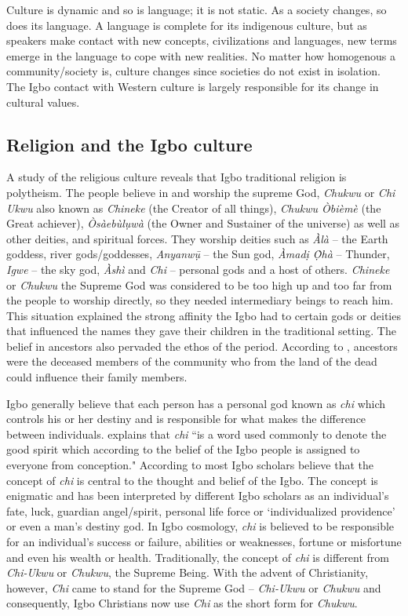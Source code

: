 \documentclass[output=paper]{langscibook}
\begin{document}
Culture is dynamic and so is language; it is not static. As a society changes, so does its language. A language is complete for its indigenous culture, but as speakers make contact with new concepts, civilizations and languages, new terms emerge in the language to cope with new realities. No matter how homogenous a community/society is, culture changes since societies do not exist in isolation. The Igbo contact with Western culture is largely responsible for its change in cultural values.

\subsection{Religion and the Igbo culture}
A study of the religious culture reveals that Igbo traditional religion is polytheism. The people believe in and worship the supreme God, \textit{Chukwu }or \textit{Chi Ukwu} also known as \textit{Chineke} (the Creator of all things), \textit{Chukwu Òbièmè} (the Great achiever), \textit{Òsàebùlụwà} (the Owner and Sustainer of the universe) as well as other deities, and spiritual forces. They worship deities such as \textit{Àlà} -- the Earth goddess, river gods/goddesses, \textit{Anyanwụ̄} -- the Sun god, \textit{Àmadị Ọ̀hà} -- Thunder,  \textit{Igwe} -- the sky god, \textit{Àshì} and \textit{Chi} -- personal gods and a host of others. \textit{Chineke} or \textit{Chukwu} the Supreme God was considered to be too high up and too far from the people to worship directly, so they needed intermediary beings to reach him. This situation explained the strong affinity the Igbo had to certain gods or deities that influenced the names they gave their children in the traditional setting. The belief in ancestors also pervaded the ethos of the period. According to \citet{Aligwekwe1991}, ancestors were the deceased members of the community who from the land of the dead could influence their family members.

Igbo generally believe that each person has a personal god known as \textit{chi} which controls his or her destiny and is responsible for what makes the difference between individuals. \citet{Ezeanya1967} explains that \textit{chi} ``is a word used commonly to denote the good spirit which according to the belief of the Igbo people is assigned to everyone from conception." According to \citet{Onukawa1999} most Igbo scholars believe that the concept of \textit{chi} is central to the thought and belief of the Igbo. The concept is enigmatic and has been interpreted by different Igbo scholars as an individual’s fate, luck, guardian angel/spirit, personal life force or ‘individualized providence’ or even a man’s destiny god. In Igbo cosmology, \textit{chi} is believed to be responsible for an individual’s success or failure, abilities or weaknesses, fortune or misfortune and even his wealth or health. Traditionally, the concept of \textit{chi} is different from \textit{Chi-Ukwu} or \textit{Chukwu}, the Supreme Being. With the advent of Christianity, however, \textit{Chi} came to stand for the Supreme God -- \textit{Chi-Ukwu} or \textit{Chukwu} and consequently, Igbo Christians now use \textit{Chi} as the short form for \textit{Chukwu}.
\end{document}
